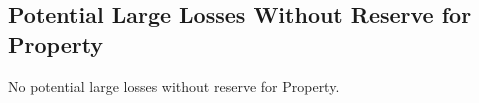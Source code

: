 \subsection*{Potential Large Losses Without Reserve for Property}
                        
                        No potential large losses without reserve for Property.
                        